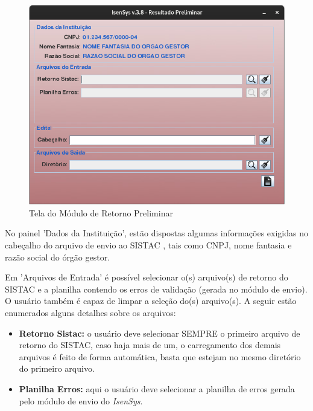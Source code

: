 \documentclass[
	12pt,			%
	openright,		%
	oneside,	
	a4paper,		%
	english,		%
	brazil			%
]{abntex2/abntex2}  %
\begin{document}
					\begin{figure}[H]
						\begin{center}
							
							\caption{Tela do Módulo de Retorno Preliminar}
							\label{retorno-prelim-ui}
							
							\includegraphics[scale=0.6]{img/retorno-prelim-ui}
							
						\end{center}
					\end{figure}
	
					No painel 'Dados da Instituição', estão dispostas algumas informações exigidas no cabeçalho do arquivo de envio ao SISTAC \cite{sistac-formatos}, tais como CNPJ, nome fantasia e razão social do órgão gestor.
	
					Em 'Arquivos de Entrada' é possível selecionar o(s) arquivo(s) de retorno do SISTAC e a planilha contendo os erros de validação (gerada no módulo de envio). O usuário também é capaz de limpar a seleção do(s) arquivo(s). A seguir estão enumerados alguns detalhes sobre os arquivos:
	
					\begin{itemize}
						
						\item \textbf{Retorno Sistac:} o usuário deve selecionar SEMPRE o primeiro arquivo de retorno do SISTAC, caso haja mais de um, o carregamento dos demais arquivos é feito de forma automática, basta que estejam no mesmo diretório do primeiro arquivo.
						
						\item \textbf{Planilha Erros:} aqui o usuário deve selecionar a planilha de erros gerada pelo módulo de envio do \textit{IsenSys}.
						
					\end{itemize}
		
\end{document}
